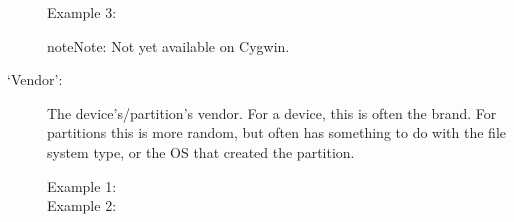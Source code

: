 \documentclass[letterpaper,10pt,english]{sphinxmanual}
\begin{document}
\begin{description}
\begin{description}
\item[{Example 3:}] \leavevmode
\begin{sphinxVerbatim}[commandchars=\\\{\}]
\PYG{p}{[}\PYG{p}{]}\PYG{p}{[}\PYG{p}{]}
\PYG{p}{[} \PYG{p}{]}
\end{sphinxVerbatim}

\end{description}

\begin{sphinxadmonition}{note}{Note:}
Not yet available on Cygwin.
\end{sphinxadmonition}

\item[{‘Vendor’:}] \leavevmode
The device’s/partition’s vendor. For a device, this is often the brand. For
partitions this is more random, but often has something to do with the
file system type, or the OS that created the partition.
\begin{description}
\item[{Example 1:}] \leavevmode
\begin{sphinxVerbatim}[commandchars=\\\{\}]
\PYG{p}{[}\PYG{p}{]}\PYG{p}{[}\PYG{p}{]}
\end{sphinxVerbatim}

\item[{Example 2:}] \leavevmode
\begin{sphinxVerbatim}[commandchars=\\\{\}]
\PYG{p}{[}\PYG{p}{]}\PYG{p}{[}\PYG{p}{]}
\end{sphinxVerbatim}


\end{description}
\end{description}
\end{document}
